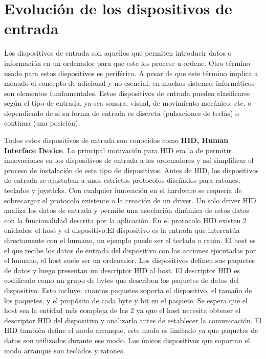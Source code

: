 \section{Evoluci\'on de los dispositivos de entrada}

Los dispositivos de entrada son aquellos que permiten introducir datos o informaci\'on en un ordenador para que este los procese u ordene. Otro t\'ermino usado para estos dispositivos es perif\'erico. A pesar de que este t\'ermino implica a menudo el concepto de adicional y no esencial, en muchos sistemas inform\'aticos son elementos fundamentales. Estos dispositivos de entrada pueden clasificarse seg\'un el tipo de entrada, ya sea sonora, visual, de movimiento mec\'anico, etc. o dependiendo de si su forma de entrada es discreta (pulsaciones de teclas) o continua (una posici\'on).

Todos estos dispositivos de entrada son conocidos como \textbf{HID, Human Interface Device}. La principal motivaci\'on para HID era la de permitir innovaciones en los dispositivos de entrada a los ordenadores y as\'i simplificar el proceso de instalaci\'on de este tipo de dispositivos. Antes de HID, los dispositivos de entrada se ajustaban a unos estrictos protocolos dise\~nados para ratones, teclados y joysticks. Con cualquier innovaci\'on en el hardware se requer\'ia de sobrecargar el protocolo existente o la creaci\'on de un driver. Un solo driver HID analiza los datos de entrada y permite una asociaci\'on din\'amica de estos datos con la funcionalidad descrita por la aplicaci\'on. En el protocolo HID existen 2 enidades: el host y el dispositivo.El dispositivo es la entrada que intercat\'ua directamente con el humano, un ejemplo puede ser el teclado o rat\'on. El host es el que recibe los datos de entrada del dispositivo con las acciones ejecutadas por el humano, el host suele ser un ordenador.
 Los dispositivos definen sus paquetes de datos y luego presentan un descriptor HID al host. El descriptor HID es codificado como un grupo de bytes que describen los paquetes de datos del dispositivo. Esto incluye: cuantos paquetes soporta el dispositivo, el tama\~no de los paquetes, y el prop\'osito de cada byte y bit en el paquete. Se espera que el host sea la entidad m\'as compleja de las 2 ya que el host necesita obtener el descriptor HID del dispositivo y analizarlo antes de establecer la comunicaci\'on. El HID tambi\'en define el modo arranque, este modo es limitado ya que paquetes de datos son utilizados durante ese modo. Los \'unicos dispositivos que soportan el modo arranque son teclados y ratones.\par


